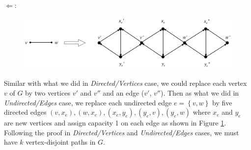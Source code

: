 \begin{enumerate}
	$\Leftarrow$:
	\begin{figure}[h]
	\centering
	\includegraphics[scale=0.4]{hw4p5c}
	\caption{}
	\label{fig:p5c}
	\end{figure}
	Similar with what we did in \textit{Directed/Vertices} case, we could replace each vertex $v$ of $G$ by two vertices $v'$ and $v''$ and an edge ($v'$, $v''$). Then as what we did in \textit{Undirected/Edges} case, we replace each undirected edge $e = \left\{ v, w \right\}$  by five directed edges $(v, x_e), (w, x_e), (x_e, y_e), (y_e, v), (y_e, w)$ where $x_e$ and $y_e$ are new vertices and assign capacity 1 on each edge as shown in Figure \ref{fig:p5c}. Following the proof in \textit{Directed/Vertices} and \textit{Undirected/Edges} cases, we must have $k$ vertex-disjoint paths in $G$.
\end{enumerate}